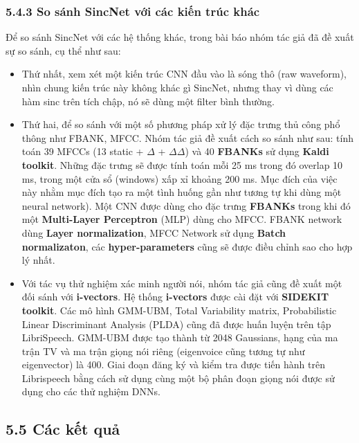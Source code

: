 \documentclass{article}
\begin{document}
	\subsubsection{5.4.3 So sánh SincNet với các kiến trúc khác}
	Để so sánh SincNet với các hệ thống khác, trong bài báo nhóm tác giả đã đề xuất sự so sánh, cụ thể như sau:
	\begin{itemize}
		\item Thứ nhất, xem xét một kiến trúc CNN đầu vào là sóng thô (raw waveform), nhìn chung kiến trúc này không khác gì SincNet, nhưng thay vì dùng các hàm sinc trên tích chập, nó sẽ dùng một filter bình thường.
		\item Thứ hai, để so sánh với một số phương pháp xử lý đặc trưng thủ công phổ thông như FBANK, MFCC. Nhóm tác giả đề xuất cách so sánh như sau: tính toán 39 MFCCs (13 static + $\Delta$ + $\Delta\Delta$) và 40 \textbf{FBANKs} sử dụng \textbf{Kaldi toolkit}. Những đặc trưng sẽ được tính toán mỗi 25 ms trong đó overlap 10 ms, trong một cửa sổ (windows) xấp xỉ khoảng 200 ms. Mục đích của việc này nhằm mục đích tạo ra một tình huống gần như tương tự khi dùng một neural network). Một CNN được dùng cho đặc trưng \textbf{FBANKs} trong khi đó một \textbf{Multi-Layer Perceptron} (MLP) dùng cho MFCC. FBANK network dùng \textbf{Layer normalization}, MFCC Network sử dụng \textbf{Batch normalizaton}, các \textbf{hyper-parameters} cũng sẽ được điều chỉnh sao cho hợp lý nhất.
		\item Với tác vụ thử nghiệm xác minh người nói, nhóm tác giả cũng đề xuất một đối sánh với \textbf{i-vectors}. Hệ thống \textbf{i-vectors} được cài đặt với \textbf{SIDEKIT toolkit}. Các mô hình GMM-UBM, Total Variability matrix, Probabilistic Linear Discriminant Analysis (PLDA) cũng đã được huấn luyện trên tập LibriSpeech. GMM-UBM được tạo thành từ 2048 Gaussians, hạng của ma trận TV và ma trận giọng nói riêng (eigenvoice cũng tương tự như eigenvector) là 400. Giai đoạn đăng ký và kiểm tra được tiến hành trên Librispeech bằng cách sử dụng cùng một bộ phân đoạn giọng nói được sử dụng cho các thử nghiệm DNNs.
	\end{itemize}
	
	\subsection{5.5 Các kết quả}
	
\end{document}

